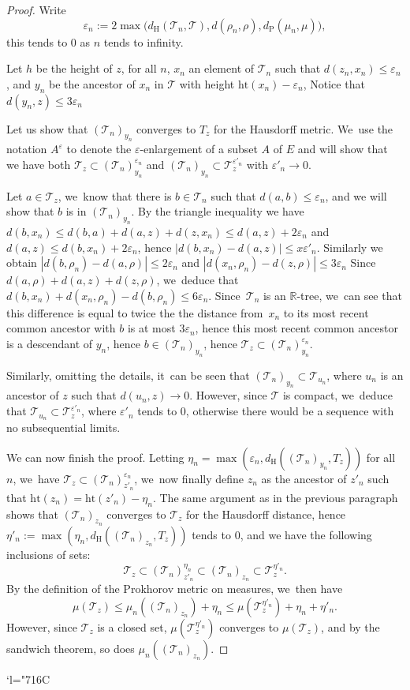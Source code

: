 \documentclass[JEP,XML,SOM,Unicode,NoFloatCountersInSection, NoEqCountersInSection,published]{cedram}
\newcommand{\Changelback}{\mathcode`l="716C}
\newcommand{\R}{{\mathbb{R}}}
\newcommand{\T}{\mathcal{T}}\let\CRT\T\let\tbr\T
\let\veps\varepsilon
\theoremstyle{definition}
\begin{document}
\begin{proof}
Write
\[
\veps_n := 2 \max\bigl(d_{\mathrm{H}}(\T_n,\T) , d(\rho_n,\rho), d_{\mathrm{P}}(\mu_n,\mu)\bigr),
\]
this tends to $0$ as $n$ tends to infinity.

Let $h$ be the height of $z$, for all $n$, $x_n$ an element of $\T_n$ such that $d(z_n,x_n)\leq \veps_n$, and $y_n$ be the ancestor of $x_n$ in $\T$ with height $\mathrm{ht}(x_n)-\veps_n$, Notice that $d(y_n,z)\leq 3\veps_n$

Let us show that $(\T_n)_{y_n}$ converges to $T_z$ for the Hausdorff metric. We~use the notation $A^{\veps}$ to denote the $\veps$-enlargement of a subset $A$ of $E$ and will show that we have both $\T_z\subset (\T_n)_{y_n}^{\veps_n}$ and $(\T_n)_{y_n}\subset \T_z^{\veps'_n}$ with $\veps'_n\to 0$.

Let $a\in \T_z$, we~know that there is $b\in \T_n$ such that $d(a,b)\leq \veps_n$, and we will show that $b$ is in $(\T_n)_{y_n}$. By the triangle inequality we have $d(b,x_n)\leq d(b,a)+d(a,z)+d(z,x_n)\leq d(a,z)+2\veps_n$ and $d(a,z)\leq d(b,x_n)+2\veps_n$, hence $|d(b,x_n)-d(a,z)|\leq x\veps'_n$. Similarly we obtain $|d(b,\rho_n)-d(a,\rho)|\leq 2\veps_n$ and $|d(x_n,\rho_n)-d(z,\rho)|\leq 3\veps_n$ Since $d(a,\rho)+d(a,z)+d(z,\rho)$, we~deduce that $d(b,x_n)+d(x_n,\rho_n)-d(b,\rho_n)\leq 6\veps_n$. Since~$\T_n$ is an $\R$-tree, we~can see that this difference is equal to twice the the distance from~$x_n$ to its most recent common ancestor with $b$ is at most $3\veps_n$, hence this most recent common ancestor is a descendant of $y_n$, hence $b\in (\T_n)_{y_n}$, hence $\T_z\subset (\T_n)_{y_n}^{\veps_n}$.

Similarly, omitting the details, it~can be seen that $(\T_n)_{y_n}\subset \T_{u_n}$, where $u_n$ is an ancestor of $z$ such that $d(u_n,z)\to 0$. However, since $\T$ is compact, we~deduce that $\T_{u_n}\subset \T_z^{\veps'_n}$, where $\veps'_n$ tends to $0$, otherwise there would be a sequence with no subsequential limits.

We can now finish the proof. Letting $\eta_n=\max(\veps_n,d_{\mathrm{H}}((\T_n)_{y_n},T_z))$ for all $n$, we~have $\T_z\subset (\T_n)^{\veps_n}_{z'_n}$, we~now finally define $z_n$ as the ancestor of $z'_n$ such that $\mathrm{ht}(z_n)=\mathrm{ht}(z'_n)-\eta_n$. The same argument as in the previous paragraph shows that $(\T_n)_{z_n}$ converges to $\T_z$ for the Hausdorff distance, hence $\eta'_n:=\max(\eta_n,d_{\mathrm{H}}((\T_n)_{z_n},T_z))$ tends to $0$, and we have the following inclusions of sets:
\[
\T_z\subset (\T_n)_{z'_n}^{\eta_n} \subset (\T_n)_{z_n} \subset \T_z^{\eta'_n}.
\]
By the definition of the Prokhorov metric on measures, we~then have
\[
\mu(\T_z)\leq \mu_n((\T_n)_{z_n})+\eta_n\leq \mu(\T_z^{\eta'_n})+\eta_n+\eta'_n.
\]
However, since $\T_z$ is a closed set, $\mu(\T_z^{\eta'_n})$ converges to $\mu(\T_z)$, and by the sandwich theorem, so does $\mu_n((\T_n)_{z_n})$.
\end{proof}

\Changelback
\enlargethispage{-\baselineskip}
\backmatter


\end{document}
